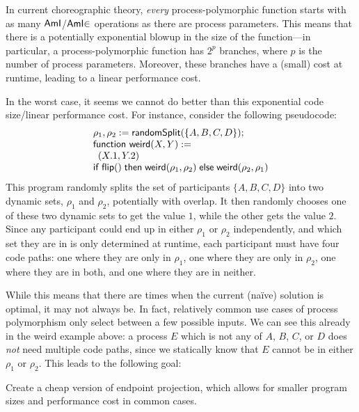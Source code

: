 In current choreographic theory, \emph{every} process-polymorphic function starts with as many $\textsf{AmI}$/$\textsf{AmI}\mathord{\in}$ operations as there are process parameters.
This means that there is a potentially exponential blowup in the size of the function---in particular, a process-polymorphic function has $2^p$ branches, where $p$ is the number of process parameters.
Moreover, these branches have a (small) cost at runtime, leading to a linear performance cost.

In the worst case, it seems we cannot do better than this exponential code size/linear performance cost.
For instance, consider the following pseudocode:
$$
\begin{array}{l}
  \rho_1, \rho_2 := \textsf{randomSplit}(\{A,B,C,D\});\\
  \textsf{function}~\textsf{weird}(X,Y) :=\\
  \begin{array}[t]{l}
    (X.1, Y.2)
  \end{array}\\
  \textsf{if}~\textsf{flip}()\mathrel{\textsf{then}}\textsf{weird}(\rho_1, \rho_2)\mathrel{\textsf{else}}\textsf{weird}(\rho_2, \rho_1)
\end{array}
$$
This program randomly splits the set of participants $\{A, B, C, D\}$ into two dynamic sets, $\rho_1$ and $\rho_2$, potentially with overlap.
It then randomly chooses one of these two dynamic sets to get the value $1$, while the other gets the value $2$.
Since any participant could end up in either $\rho_1$ or $\rho_2$ independently, and which set they are in is only determined at runtime, each participant must have four code paths: one where they are only in $\rho_1$, one where they are only in $\rho_2$, one where they are in both, and one where they are in neither.

While this means that there are times when the current (na\"ive) solution is optimal, it may not always be.
In fact, relatively common use cases of process polymorphism only select between a few possible inputs.
We can see this already in the \textsf{weird} example above: a process $E$ which is not any of $A$, $B$, $C$, or $D$ does \emph{not} need multiple code paths, since we statically know that $E$ cannot be in either $\rho_1$ or $\rho_2$.
This leads to the following goal:
\begin{goal}
  Create a cheap version of endpoint projection, which allows for smaller program sizes and performance cost in common cases.
\end{goal}

